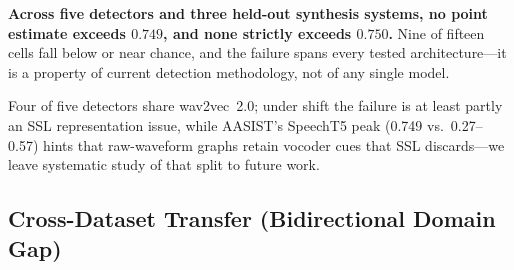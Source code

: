 \documentclass{article}
\begin{document}
\textbf{Across five detectors and three held-out synthesis systems, no point
estimate exceeds $0.749$, and none strictly exceeds $0.750$.}
Nine of fifteen cells fall below or near chance,
and the failure spans every tested architecture---it is a property of current
detection methodology, not of any single model.

Four of five detectors share wav2vec~2.0; under shift the failure is at least partly
an SSL representation issue, while AASIST's SpeechT5 peak (0.749 vs.\ 0.27--0.57)
hints that raw-waveform graphs retain vocoder cues that SSL discards---we leave
systematic study of that split to future work.

\subsection{Cross-Dataset Transfer (Bidirectional Domain Gap)}
\end{document}
